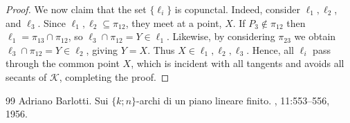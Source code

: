 \documentclass[10pt,a4paper]{amsart}
\newcommand{\K}{\mathcal{K}}
\begin{document}
\begin{proof}
 
	We now claim that the set \( \{\ell_i\} \) is copunctal.  Indeed, consider $\ell_1, \ell_2$, and $\ell_3$.  Since $\ell_1,\ell_2 \subseteq \pi_{12}$, they meet at a point, $X$. If $P_3\notin \pi_{12}$ then $\ell_1=\pi_{13}\cap\pi_{12}$, so $\ell_3\cap \pi_{12}=Y\in \ell_1$.  Likewise, by considering $\pi_{23}$ we obtain $\ell_3\cap \pi_{12}=Y\in \ell_2$, giving $Y=X$.  Thus $X\in \ell_1,\ell_2,\ell_3$. Hence, all \( \ell_i \) pass through the common point \( X \), which is incident with all tangents and avoids all secants of \( \K \), completing the proof.
\end{proof}

\begin{thebibliography}{99}
 Adriano Barlotti. \newblock Sui {$\{k;n\}$}-archi di un piano lineare finito. , 11:553--556, 1956.
\end{thebibliography}
\end{document}
